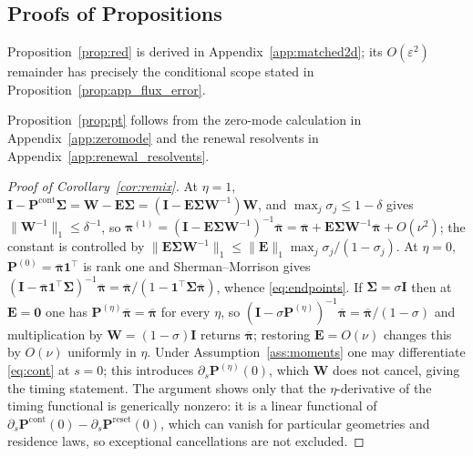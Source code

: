 \documentclass[pdflatex,sn-mathphys-num]{sn-jnl}
\numberwithin{equation}{section}
\theoremstyle{thmstyleone}%
\theoremstyle{definition}
\theoremstyle{remark}
\begin{document}
\begin{appendices}
\section{Proofs of Propositions}
\label{app:proofs}

Proposition~\ref{prop:red} is derived in Appendix~\ref{app:matched2d}; its
$O(\varepsilon^2)$ remainder has precisely the conditional scope stated in
Proposition~\ref{prop:app_flux_error}.

Proposition~\ref{prop:pt} follows from the zero-mode calculation in
Appendix~\ref{app:zeromode} and the renewal resolvents in
Appendix~\ref{app:renewal_resolvents}.

\begin{proof}[Proof of Corollary~\ref{cor:remix}]
At $\eta=1$, $\mathbf I-\mathbf P^{\mathrm{cont}}\bm\Sigma
=\bm W-\mathbf E\bm\Sigma=(\mathbf I-\mathbf E\bm\Sigma\bm W^{-1})\bm W$, and
$\max_j\sigma_j\le1-\delta$ gives $\|\bm W^{-1}\|_1\le\delta^{-1}$, so
$\bm\pi^{(1)}=(\mathbf I-\mathbf E\bm\Sigma\bm W^{-1})^{-1}\overline{\bm\pi}
=\overline{\bm\pi}+\mathbf E\bm\Sigma\bm W^{-1}\overline{\bm\pi}+O(\nu^2)$; the
constant is controlled by
$\|\mathbf E\bm\Sigma\bm W^{-1}\|_1\le\|\mathbf E\|_1\max_j\sigma_j/(1-\sigma_j)$.
At $\eta=0$, $\mathbf P^{(0)}=\overline{\bm\pi}\mathbf1^\top$ is rank one and
Sherman--Morrison gives
$(\mathbf I-\overline{\bm\pi}\mathbf1^\top\bm\Sigma)^{-1}\overline{\bm\pi}
=\overline{\bm\pi}/(1-\mathbf1^\top\bm\Sigma\overline{\bm\pi})$, whence
\eqref{eq:endpoints}. If $\bm\Sigma=\sigma\mathbf I$ then at $\mathbf E=\mathbf0$
one has $\mathbf P^{(\eta)}\overline{\bm\pi}=\overline{\bm\pi}$ for every
$\eta$, so $(\mathbf I-\sigma\mathbf P^{(\eta)})^{-1}\overline{\bm\pi}
=\overline{\bm\pi}/(1-\sigma)$ and multiplication by $\bm W=(1-\sigma)\mathbf I$
returns $\overline{\bm\pi}$; restoring $\mathbf E=O(\nu)$ changes this by
$O(\nu)$ uniformly in $\eta$. Under Assumption~\ref{ass:moments} one may
differentiate \eqref{eq:cont} at $s=0$; this introduces
$\partial_s\mathbf P^{(\eta)}(0)$, which $\bm W$ does not cancel, giving the
timing statement. The argument shows only that the $\eta$-derivative of the
timing functional is generically nonzero: it is a linear functional of
$\partial_s\mathbf P^{\mathrm{cont}}(0)-\partial_s\mathbf
P^{\mathrm{reset}}(0)$, which can vanish for particular geometries and
residence laws, so exceptional cancellations are not excluded.
\end{proof}


\end{appendices}
\end{document}

